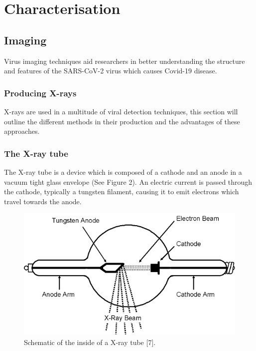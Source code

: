 \documentclass[11pt]{report}
\begin{document}
\medskip





		\section{Characterisation}




			\subsection{Imaging}
			
			Virus imaging techniques aid researchers in better understanding the structure and features of the SARS-CoV-2 virus which causes Covid-19 disease.			


\subsubsection{Producing X-rays}

X-rays are used in a multitude of viral detection techniques, this section will outline the different methods in their production and the advantages of these approaches.

\subsubsection{The X-ray tube}

The X-ray tube is a device which is composed of a cathode and an anode in a vacuum tight glass envelope  (See Figure 2). An electric current is passed through the cathode, typically a tungsten filament, causing it to emit electrons which travel towards the anode.

\begin{figure}[h!]
\centering
\includegraphics[scale=0.4]{X-ray Tube image.jpg}
\caption{Schematic of the inside of a X-ray tube \cite{xraytubediag}[7].}
\label{2}
\end{figure}
\end{document}
